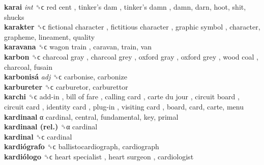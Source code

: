\textbf{karai} \emph{int}  ␝ϲ   red cent ,  tinker’s dam ,  tinker’s damn , damn, darn, hoot, shit, shucks  \\
\textbf{karakter} ␝ϲ   fictional character ,  fictitious character ,  graphic symbol , character, grapheme, lineament, quality  \\
\textbf{karavana} ␝ϲ   wagon train , caravan, train, van  \\
\textbf{karbon} ␝ϲ   charcoal gray ,  charcoal grey ,  oxford gray ,  oxford grey ,  wood coal , charcoal, fusain  \\
\textbf{karbonisá} \emph{adj}  ␝ϲ  carbonise, carbonize  \\
\textbf{karbureter} ␝ϲ  carburetor, carburettor  \\
\textbf{karchi} ␝ϲ   add-in ,  bill of fare ,  calling card ,  carte du jour ,  circuit board ,  circuit card ,  identity card ,  plug-in ,  visiting card , board, card, carte, menu  \\
\textbf{kardinaal} α  cardinal, central, fundamental, key, primal  \\
\textbf{kardinaal (rel.)} ␝α  cardinal  \\
\textbf{kardinal} ␝ϲ  cardinal  \\
\textbf{kardiógrafo} ␝ϲ  ballistocardiograph, cardiograph  \\
\textbf{kardiólogo} ␝ϲ   heart specialist ,  heart surgeon , cardiologist  \\
